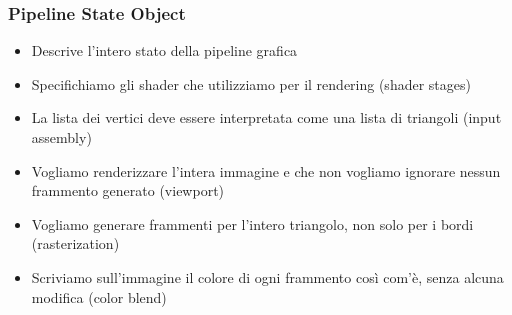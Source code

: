 \begin{frame}
\frametitle{Pipeline State Object}

\begin{itemize}
\item Descrive l'intero stato della pipeline grafica
\item Specifichiamo gli shader che utilizziamo per il rendering (shader stages)
\item La lista dei vertici deve essere interpretata come una lista di triangoli (input assembly)
\item Vogliamo renderizzare l'intera immagine e che non vogliamo ignorare nessun frammento generato (viewport)
\item Vogliamo generare frammenti per l'intero triangolo, non solo per i bordi (rasterization)
\item Scriviamo sull'immagine il colore di ogni frammento così com'è, senza alcuna modifica (color blend)
\end{itemize}

\end{frame}
